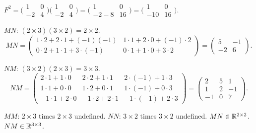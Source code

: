 \begin{solutions}
    \item $F^{2} = \bigl(\begin{smallmatrix} 1 & 0 \\ -2 & 4 \end{smallmatrix}\bigr)\bigl(\begin{smallmatrix} 1 & 0 \\ -2 & 4 \end{smallmatrix}\bigr) = \bigl(\begin{smallmatrix} 1 & 0 \\ -2 - 8 & 16 \end{smallmatrix}\bigr) = \bigl(\begin{smallmatrix} 1 & 0 \\ -10 & 16 \end{smallmatrix}\bigr)$.

    \item $M N$: $(2 \times 3)(3 \times 2) = 2 \times 2$.
    \[
    M N = \begin{pmatrix} 1 \cdot 2 + 2 \cdot 1 + (-1)(-1) & 1 \cdot 1 + 2 \cdot 0 + (-1) \cdot 2 \\ 0 \cdot 2 + 1 \cdot 1 + 3 \cdot (-1) & 0 \cdot 1 + 1 \cdot 0 + 3 \cdot 2 \end{pmatrix} = \begin{pmatrix} 5 & -1 \\ -2 & 6 \end{pmatrix}.
    \]

    \item $N M$: $(3 \times 2)(2 \times 3) = 3 \times 3$.
    \[
    N M = \begin{pmatrix} 2 \cdot 1 + 1 \cdot 0 & 2 \cdot 2 + 1 \cdot 1 & 2 \cdot (-1) + 1 \cdot 3 \\ 1 \cdot 1 + 0 \cdot 0 & 1 \cdot 2 + 0 \cdot 1 & 1 \cdot (-1) + 0 \cdot 3 \\ -1 \cdot 1 + 2 \cdot 0 & -1 \cdot 2 + 2 \cdot 1 & -1 \cdot (-1) + 2 \cdot 3 \end{pmatrix} = \begin{pmatrix} 2 & 5 & 1 \\ 1 & 2 & -1 \\ -1 & 0 & 7 \end{pmatrix}.
    \]

    \item $M M$: $2 \times 3$ times $2 \times 3$ undefined. $N N$: $3 \times 2$ times $3 \times 2$ undefined. $M N \in \mathbb{R}^{2 \times 2}$. $N M \in \mathbb{R}^{3 \times 3}$.


\end{solutions}
